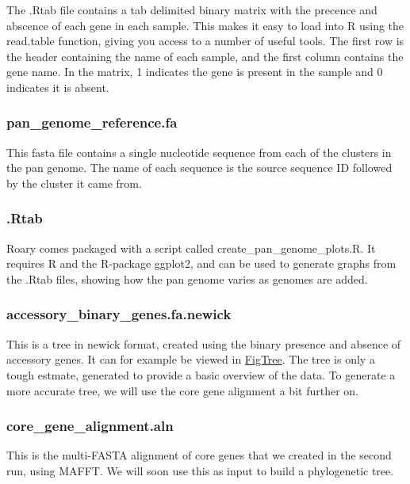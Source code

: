 \documentclass[11pt]{article}
\begin{document}
The .Rtab file contains a tab delimited binary matrix with the precence
and abscence of each gene in each sample. This makes it easy to load
into R using the read.table function, giving you access to a number of
useful tools. The first row is the header containing the name of each
sample, and the first column contains the gene name. In the matrix, 1
indicates the gene is present in the sample and 0 indicates it is
absent.

\hypertarget{pan_genome_reference.fa}{%
\subsubsection{pan\_genome\_reference.fa}\label{pan_genome_reference.fa}}

This fasta file contains a single nucleotide sequence from each of the
clusters in the pan genome. The name of each sequence is the source
sequence ID followed by the cluster it came from.

\hypertarget{rtab}{%
\subsubsection{.Rtab}\label{rtab}}

Roary comes packaged with a script called create\_pan\_genome\_plots.R.
It requires R and the R-package ggplot2, and can be used to generate
graphs from the .Rtab files, showing how the pan genome varies as
genomes are added.

\hypertarget{accessory_binary_genes.fa.newick}{%
\subsubsection{accessory\_binary\_genes.fa.newick}\label{accessory_binary_genes.fa.newick}}

This is a tree in newick format, created using the binary presence and
absence of accessory genes. It can for example be viewed in
\href{http://tree.bio.ed.ac.uk/software/figtree/}{FigTree}. The tree is
only a tough estmate, generated to provide a basic overview of the data.
To generate a more accurate tree, we will use the core gene alignment a
bit further on.

\hypertarget{core_gene_alignment.aln}{%
\subsubsection{core\_gene\_alignment.aln}\label{core_gene_alignment.aln}}

This is the multi-FASTA alignment of core genes that we created in the
second run, using MAFFT. We will soon use this as input to build a
phylogenetic tree.
\end{document}
